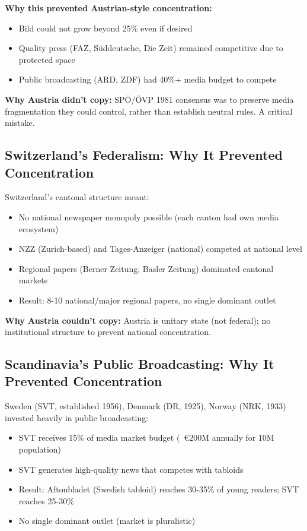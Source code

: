 {\textbf{Why this prevented Austrian-style concentration:}
\begin{itemize}
\item Bild could not grow beyond 25\% even if desired
\item Quality press (FAZ, Süddeutsche, Die Zeit) remained competitive due to protected space
\item Public broadcasting (ARD, ZDF) had 40\%+ media budget to compete
\end{itemize}

\textbf{Why Austria didn't copy:} SPÖ/ÖVP 1981 consensus was to preserve media fragmentation
they could control, rather than establish neutral rules. A critical mistake.

\subsection*{Switzerland's Federalism: Why It Prevented Concentration}

Switzerland's cantonal structure meant:
\begin{itemize}
\item No national newspaper monopoly possible (each canton had own media ecosystem)
\item NZZ (Zurich-based) and Tages-Anzeiger (national) competed at national level
\item Regional papers (Berner Zeitung, Basler Zeitung) dominated cantonal markets
\item Result: 8-10 national/major regional papers, no single dominant outlet
\end{itemize}

\textbf{Why Austria couldn't copy:} Austria is unitary state (not federal); no institutional
structure to prevent national concentration.

\subsection*{Scandinavia's Public Broadcasting: Why It Prevented Concentration}

Sweden (SVT, established 1956), Denmark (DR, 1925), Norway (NRK, 1933) invested heavily in
public broadcasting:

\begin{itemize}
\item SVT receives 15\% of media market budget (~€200M annually for 10M population)
\item SVT generates high-quality news that competes with tabloids
\item Result: Aftonbladet (Swedish tabloid) reaches 30-35\% of young readers; SVT reaches 25-30\%
\item No single dominant outlet (market is pluralistic)
\end{itemize}

}
